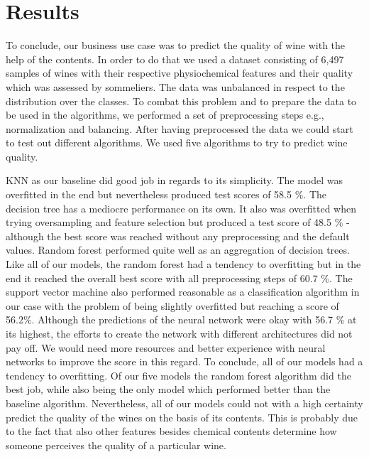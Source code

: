 \chapter{Results}
To conclude, our business use case was to predict the quality of wine with the help of the contents. In order to do that we used a dataset consisting of 6,497 samples of wines with their respective physiochemical features and their quality which was assessed by sommeliers. The data was unbalanced in respect to the distribution over the classes. To combat this problem and to prepare the data to be used in the algorithms, we performed a set of preprocessing steps e.g., normalization and balancing. After having preprocessed the data we could start to test out different algorithms. We used five algorithms to try to predict wine quality. 

KNN as our baseline did good job in regards to its simplicity. The model was overfitted in the end but nevertheless produced test scores of 58.5 \%. The decision tree has a mediocre performance on its own. It also was overfitted when trying oversampling and feature selection but produced a test score of 48.5 \% - although the best score was reached without any preprocessing and the default values. Random forest performed quite well as an aggregation of decision trees. Like all of our models, the random forest had a tendency to overfitting but in the end it reached the overall best score with all preprocessing steps of 60.7 \%. The support vector machine also performed reasonable as a classification algorithm in our case with the problem of being slightly overfitted but reaching a score of 56.2\%.
Although the predictions of the neural network were okay with 56.7 \% at its highest, the efforts to create the network with different architectures did not pay off. We would need more resources and better experience with neural networks to improve the score in this regard. To conclude, all of our models had a tendency to overfitting.
Of our five models the random forest algorithm did the best job, while also being the only model which performed better than the baseline algorithm.
Nevertheless, all of our models could not with a high certainty predict the quality of the wines on the basis of its contents. This is probably due to the fact that also other features besides chemical contents determine how someone perceives the quality of a particular wine.